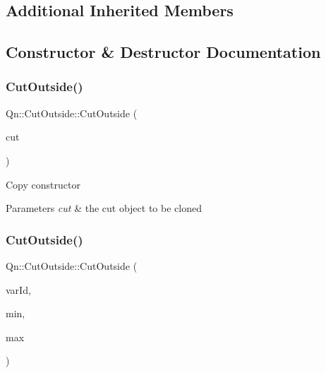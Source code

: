\subsection*{Additional Inherited Members}


\subsection{Constructor \& Destructor Documentation}
\mbox{\label{classQn_1_1CutOutside_a58878430ec8e3cdf04bbf01551915c34}} 
\subsubsection{\texorpdfstring{Cut\+Outside()}{CutOutside()}\hspace{0.1cm}{\footnotesize\ttfamily [1/2]}}
{\footnotesize\ttfamily Qn\+::\+Cut\+Outside\+::\+Cut\+Outside (\begin{DoxyParamCaption}\item[{const \mbox{\hyperlink{classQn_1_1CutOutside}{Cut\+Outside}} \&}]{cut }\end{DoxyParamCaption})}

Copy constructor 
\begin{DoxyParams}{Parameters}
{\em cut} & the cut object to be cloned \\
\hline
\end{DoxyParams}
\mbox{\label{classQn_1_1CutOutside_a1e47a825aaff83255e48dd4ee159ab54}} 
\subsubsection{\texorpdfstring{Cut\+Outside()}{CutOutside()}\hspace{0.1cm}{\footnotesize\ttfamily [2/2]}}
{\footnotesize\ttfamily Qn\+::\+Cut\+Outside\+::\+Cut\+Outside (\begin{DoxyParamCaption}\item[{Int\+\_\+t}]{var\+Id,  }\item[{Float\+\_\+t}]{min,  }\item[{Float\+\_\+t}]{max }\end{DoxyParamCaption})}

